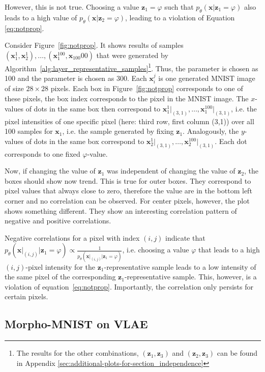 However, this is not true.
Choosing a value $\bm{z}_1 = \varphi$ such that $p_\theta(\bm{x} | \bm{z}_1 = \varphi)$ also leads to a high value of $p_\theta(\bm{x} | \bm{z}_2 = \varphi)$, leading to a violation of Equation \ref{eq:notprop}.

Consider Figure~\ref{fig:notprop}.
It shows results of samples $(\bm{x}_1^1,\bm{x}_2^1),\dots,(\bm{x}_1^{100},\bm{x}_{100}00)$ that were generated by Algorithm~\ref{alg:layer_representative_samples}\footnote{The results for the other combinations, $(\bm{z}_1,\bm{z}_3)$ and $(\bm{z}_2,\bm{z}_3)$ can be found in Appendix \ref{sec:additional-plots-for-section_independence}}.
Thus, the parameter  is chosen as 100 and the parameter  is chosen as 300.
Each $\bm{x}_i^j$ is one generated MNIST image of size $28\times 28$ pixels.
Each box in Figure~\ref{fig:notprop} corresponds to one of these pixels, the box index corresponds to the pixel in the MNIST image.
The $x$-values of dots in the same box then correspond to $\bm{x}_1^1\big|_{(3,1)}, \dots, \bm{x}_1^{100}\big|_{(3,1)}$, i.e. the pixel intensities of one specific pixel (here: third row, first column (3,1)) over all 100 samples for $\bm{x}_1$, i.e. the sample generated by fixing $\bm{z}_1$.
Analogously, the $y$-values of dots in the same box correspond to $\bm{x}_2^1\big|_{(3,1)}, \dots, \bm{x}_2^{100}\big|_{(3,1)}$.
Each dot corresponds to one fixed $\varphi$-value.

Now, if changing the value of $\bm{z}_1$ was independent of changing the value of $\bm{z}_2$, the boxes should show now trend.
This is true for outer boxes.
They correspond to pixel values that always close to zero, therefore the value are in the bottom left corner and no correlation can be observed.
For center pixels, however, the plot shows something different.
They show an interesting correlation pattern of negative and positive correlations.

Negative correlations for a pixel with index $(i,j)$ indicate that $p_\theta(\bm{x}\big|_{(i,j)} | \bm{z}_1 = \varphi) \propto \frac{1}{p_\theta(\bm{x}\big|_{(i,j)} | \bm{z}_1 = \varphi)}$, i.e. choosing a value $\varphi$ that leads to a high $(i,j)$-pixel intensity for the $\bm{z}_1$-representative sample leads to a low intensity of the same pixel of the corresponding $\bm{z}_1$-representative sample.
This, however, is a violation of equation~\ref{eq:notprop}.
Importantly, the correlation only persists for certain pixels.

\subsection{Morpho-MNIST on VLAE}\label{subsec:morpho-mnist-on-vlae}

